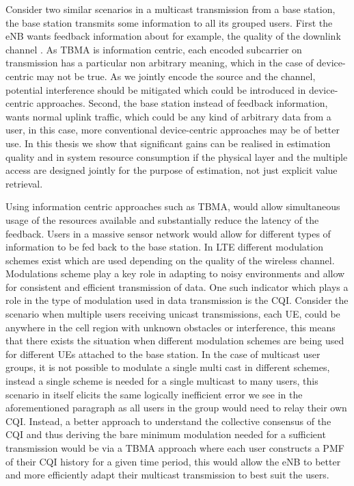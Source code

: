 \documentclass{article}
\begin{document}
Consider two similar scenarios in a multicast transmission from a base station, the base station transmits some information to all its grouped users. First the eNB wants feedback information about for example, the quality of the downlink channel . As TBMA is information centric, each encoded subcarrier on transmission has a particular non arbitrary meaning, which in the case of device-centric may not be true. As we jointly encode the source and the channel, potential interference should be mitigated which could be introduced in device-centric approaches. Second, the base station instead of feedback information, wants normal uplink traffic, which could be any kind of arbitrary data from a user, in this case, more conventional device-centric approaches may be of better use. In this thesis we show that significant gains can be realised in estimation quality and in system resource consumption if the physical layer and the multiple access are designed jointly for the purpose of estimation, not just explicit value retrieval.

Using information centric approaches such as TBMA, would allow simultaneous usage of the resources available and substantially reduce the latency of the feedback. Users in a massive sensor network would allow for different types of information to be fed back to the base station. In LTE different modulation schemes exist which are used depending on the quality of the wireless channel. Modulations scheme play a key role in adapting to noisy environments and allow for consistent and efficient transmission of data. One such indicator which plays a role in the type of modulation used in data transmission is the \ac{CQI}. Consider the scenario when multiple users receiving unicast transmissions, each UE, could be anywhere in the cell region with unknown obstacles or interference, this means that there exists the situation when different modulation schemes are being used for different UEs attached to the base station. In the case of multicast user groups, it is not possible to modulate a single multi cast in different schemes, instead a single scheme is needed for a single multicast to many users, this scenario in itself elicits the same logically inefficient error we see in the aforementioned paragraph as all users in the group would need to relay their own \ac{CQI}. Instead, a better approach to understand the collective consensus of the \ac{CQI} and thus deriving the bare minimum modulation needed for a sufficient transmission would be via a TBMA approach where each user constructs a PMF of their \ac{CQI} history for a given time period, this would allow the eNB to better and more efficiently adapt their multicast transmission to best suit the users. 
\end{document}
